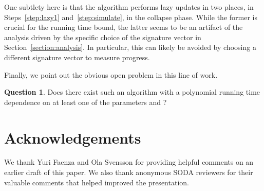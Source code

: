 \documentclass[11pt]{article}
\theoremstyle{definition}
\newtheorem{question}[theorem]{Question}
\theoremstyle{remark}
\begin{document}
One subtlety here is that the algorithm performs lazy updates in two
places, in Steps~\ref{step:lazy1} and~\ref{step:simulate}, in the
collapse phase. While the former is crucial for the running time
bound, the latter seems to be an artifact of the analysis driven by
the specific choice of the signature vector in
Section~\ref{section:analysis}. In particular, this can likely be
avoided by choosing a different signature vector to measure progress.

Finally, we point out the obvious open problem in this line of work.

\begin{question}
  Does there exist such an algorithm with a polynomial running time
  dependence on at least one of the parameters  and ?
\end{question}

\section*{Acknowledgements}
We thank Yuri Faenza and Ola Svensson for providing helpful comments
on an earlier draft of this paper. We also thank anonymous SODA
reviewers for their valuable comments that helped improved the
presentation.



\end{document}
